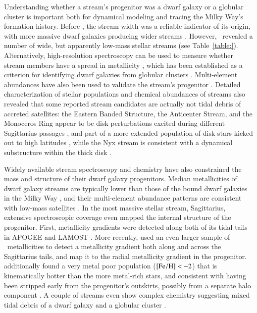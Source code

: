 \documentclass[final,5p,times,twocolumn,authoryear]{elsarticle}
\begin{document}
Understanding whether a stream's progenitor was a dwarf galaxy or a globular cluster is important both for dynamical modeling and tracing the Milky Way's formation history.
Before \gaia, the stream width was a reliable indicator of its origin, with more massive dwarf galaxies producing wider streams \citep[e.g.,][]{belokurov:2006, bonaca:2012}.
However, \gaia\ revealed a number of wide, but apparently low-mass stellar streams (see Table~\ref{table:}).
Alternatively, high-resolution spectroscopy can be used to measure whether stream members have a spread in metallicity \citep[e.g.,][]{ji:2020,chandra:2022}, which has been established as a criterion for identifying dwarf galaxies from globular clusters \citep{willman:2012}.
Multi-element abundances have also been used to validate the stream's progenitor \citep[e.g., NGC~3201 as the progenitor of the Gj\" ol stream,][]{hansen:2020}.
Detailed characterization of stellar populations and chemical abundances of streams also revealed that some reported stream candidates are actually not tidal debris of accreted satellites: the Eastern Banded Structure, the Anticenter Stream, and the Monoceros Ring appear to be disk perturbations excited during different Sagittarius passages \citep[cf.][]{deason:2018, laporte:2020}, and part of a more extended population of disk stars kicked out to high latitudes \citep{price-whelan:2015,bergemann:2018,laporte:2018}, while the Nyx stream is consistent with a dynamical substructure within the thick disk \citep[cf.][]{zucker:2021,wang:2023}.

Widely available stream spectroscopy and chemistry have also constrained the mass and structure of their dwarf galaxy progenitors.
Median metallicities of dwarf galaxy streams are typically lower than those of the bound dwarf galaxies in the Milky Way \citep{li:2022}, and their multi-element abundance patterns are consistent with low-mass satellites \citep[$\approx10^6\,\unit{\msun}$,][]{ji:2020,hawkins:2023}.
In the most massive stellar stream, Sagittarius, extensive spectroscopic coverage even mapped the internal structure of the progenitor.
First, metallicity gradients were detected along both of its tidal tails in APOGEE \citep{hayes:2020} and LAMOST \citep{zhao:2020}.
More recently, \citet{cunningham:2024} used an even larger sample of \gaia\ metallicities \citep{andrae:2023} to detect a metallicity gradient both along and across the Sagittarius tails, and map it to the radial metallicity gradient in the progenitor.
\citet{johnson:2020} additionally found a very metal poor population (${[\mathrm{Fe}/\mathrm{H}]}<-2$) that is kinematically hotter than the more metal-rich stars, and consistent with having been stripped early from the progenitor's outskirts, possibly from a separate halo component \citep[see also][]{limberg:2023}.
A couple of streams even show complex chemistry suggesting mixed tidal debris of a dwarf galaxy and a globular cluster \citep{hansen:2021,limberg:2024}.
\end{document}
